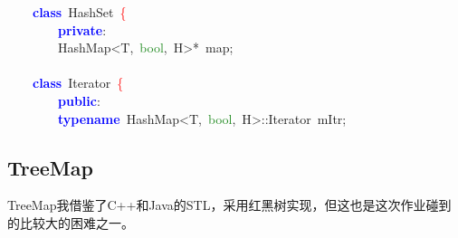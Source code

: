 \begin{center}\begin{minipage}{120mm}
\noindent
\mbox{}\ \ \ \ \textbf{\textcolor{Blue}{class}}\ \textcolor{TealBlue}{HashSet}\ \textcolor{Red}{\{} \\
\mbox{}\ \ \ \ \ \ \ \ \textbf{\textcolor{Blue}{private}}\textcolor{BrickRed}{:} \\
\mbox{}\ \ \ \ \ \ \ \ HashMap\textcolor{BrickRed}{\textless{}}T\textcolor{BrickRed}{,}\ \textcolor{ForestGreen}{bool}\textcolor{BrickRed}{,}\ H\textcolor{BrickRed}{\textgreater{}*}\ map\textcolor{BrickRed}{;} \\
\mbox{} \\
\mbox{}\ \ \ \ \textbf{\textcolor{Blue}{class}}\ \textcolor{TealBlue}{Iterator}\ \textcolor{Red}{\{} \\
\mbox{}\ \ \ \ \ \ \ \ \textbf{\textcolor{Blue}{public}}\textcolor{BrickRed}{:} \\
\mbox{}\ \ \ \ \ \ \ \ \textbf{\textcolor{Blue}{typename}}\ \textcolor{TealBlue}{HashMap}\textcolor{BrickRed}{\textless{}}T\textcolor{BrickRed}{,}\ \textcolor{ForestGreen}{bool}\textcolor{BrickRed}{,}\ H\textcolor{BrickRed}{\textgreater{}::}\textcolor{TealBlue}{Iterator}\ mItr\textcolor{BrickRed}{;} 
\end{minipage}\end{center}

\subsection{TreeMap}
TreeMap我借鉴了C++和Java的STL，采用红黑树实现，但这也是这次作业碰到的比较大的困难之一。

